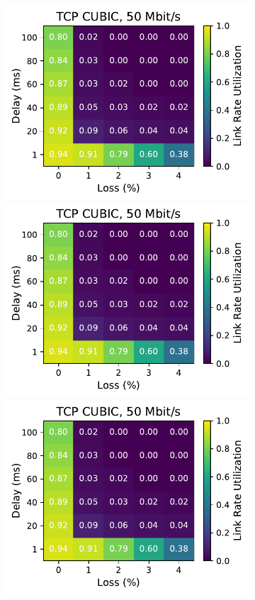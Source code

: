 \begin{figure}[ht]
\begin{subfigure}[b]{0.89cm}
        \includegraphics[width=\linewidth,trim={8cm 0 0 0},clip]{splitting/figures/heatmaps/heatmap_tcp_cubic_50mbps.pdf}
        \includegraphics[width=\linewidth,trim={8cm 0 0 0},clip]{splitting/figures/heatmaps/heatmap_tcp_cubic_50mbps.pdf}
        \includegraphics[width=\linewidth,trim={8cm 0 0 0},clip]{splitting/figures/heatmaps/heatmap_tcp_cubic_50mbps.pdf}

\end{subfigure}
\end{figure}
